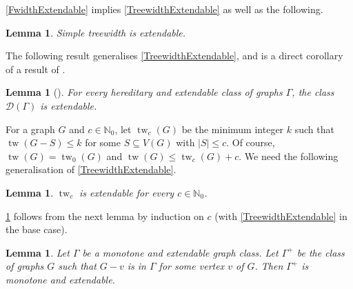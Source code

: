 \documentclass[a4paper,11pt]{article}
\theoremstyle{plain}
\newtheorem{lem}[thm]{Lemma}
\theoremstyle{definition}
\renewcommand{\leq}{\leqslant}
\DeclareMathOperator{\tw}{tw}
\newcommand{\DD}{\mathcal{D}}
\newcommand{\NN}{\mathbb{N}}
\begin{document}
\cref{FwidthExtendable} implies 
\cref{TreewidthExtendable} as well as the following.

\begin{lem}
\label{SimpleTreewidthExtendable}
Simple treewidth is extendable. 
\end{lem}

The following result generalises \cref{TreewidthExtendable}, and is a direct corollary of a result of \citet[Theorem~3.9]{KT90}.
 
\begin{lem}[\citep{KT90}] 
\label{TreeDecompExtendable}
For every hereditary and extendable class of graphs  $\Gamma$, the class $\DD(\Gamma)$ is extendable. 
\end{lem}

For a graph $G$ and $c\in\NN_0$, let $\tw_c(G)$ be the minimum integer $k$ such that $\tw(G-S)\leq k$ for some $S\subseteq V(G)$ with $|S|\leq c$. Of course, $\tw(G)=\tw_0(G)$ and $\tw(G)\leq \tw_c(G)+c$. We need the following generalisation of \cref{TreewidthExtendable}.

\begin{lem}
\label{TreewidthApexExtendable}
$\tw_c$ is extendable for every $c\in\NN_0$.
\end{lem}

\cref{TreewidthApexExtendable} follows from the next lemma by induction on $c$ (with \cref{TreewidthExtendable} in the base case). 

\begin{lem}
Let $\Gamma$ be a monotone and extendable graph class. Let $\Gamma^+$ be the class of graphs $G$ such that $G-v$ is in $\Gamma$ for some vertex $v$ of $G$. Then $\Gamma^+$ is monotone and extendable. 
\end{lem}
\end{document}
